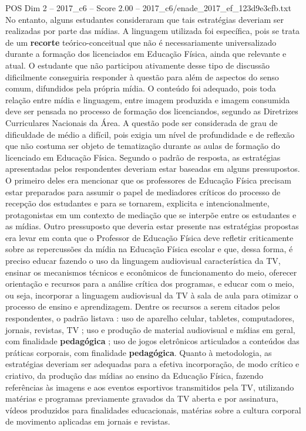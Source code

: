 \begin{textsample}{POS Dim 2 – 2017\_c6 – Score 2.00 – 2017\_c6/enade\_2017\_ef\_123d9e3cfb.txt}
No entanto, alguns estudantes consideraram que tais estratégias deveriam ser realizadas por parte das mídias.
A linguagem utilizada foi específica, pois se trata de um \textbf{recorte} teórico-conceitual que não é necessariamente universalizado durante a formação dos licenciados em Educação Física, ainda que relevante e atual.
O estudante que não participou ativamente desse tipo de discussão dificilmente conseguiria responder à questão para além de aspectos do senso comum, difundidos pela própria mídia.
O conteúdo foi adequado, pois toda relação entre mídia e linguagem, entre imagem produzida e imagem consumida deve ser pensada no processo de formação dos licenciandos, segundo as Diretrizes Curriculares Nacionais da Área.
A questão pode ser considerada de grau de dificuldade de médio a difícil, pois exigia um nível de profundidade e de reflexão que não costuma ser objeto de tematização durante as aulas de formação do licenciado em Educação Física.
Segundo o padrão de resposta, as estratégias apresentadas pelos respondentes deveriam estar baseadas em alguns pressupostos.
O primeiro deles era mencionar que os professores de Educação Física precisam estar preparados para assumir o papel de mediadores críticos do processo de recepção dos estudantes e para se tornarem, explicita e intencionalmente, protagonistas em um contexto de mediação que se interpõe entre os estudantes e as mídias.
Outro pressuposto que deveria estar presente nas estratégias propostas era levar em conta que o Professor de Educação Física deve refletir criticamente sobre as repercussões da mídia na Educação Física escolar e que, dessa forma, é preciso educar fazendo o uso da linguagem audiovisual característica da TV, ensinar os mecanismos técnicos e econômicos de funcionamento do meio, oferecer orientação e recursos para a análise crítica dos programas, e educar com o meio, ou seja, incorporar a linguagem audiovisual da TV à sala de aula para otimizar o processo de ensino e aprendizagem.
Dentre os recursos a serem citados pelos respondentes, o padrão listava : uso de aparelho celular, tabletes, computadores, jornais, revistas, TV ; uso e produção de material audiovisual e mídias em geral, com finalidade \textbf{pedagógica} ; uso de jogos eletrônicos articulados a conteúdos das práticas corporais, com finalidade \textbf{pedagógica}.
Quanto à metodologia, as estratégias deveriam ser adequadas para a efetiva incorporação, de modo crítico e criativo, da produção das mídias ao ensino da Educação Física, fazendo referências às imagens e aos eventos esportivos transmitidos pela TV, utilizando matérias e programas previamente gravados da TV aberta e por assinatura, vídeos produzidos para finalidades educacionais, matérias sobre a cultura corporal de movimento aplicadas em jornais e revistas.

\end{textsample}
